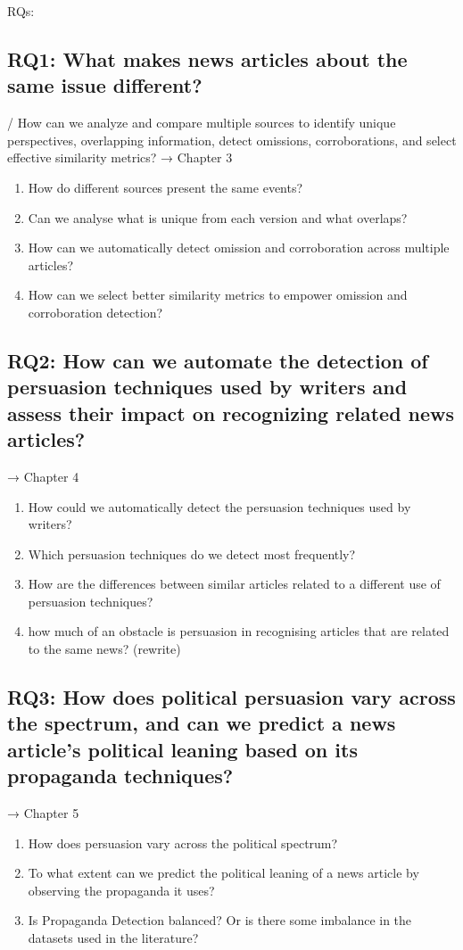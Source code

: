 RQs:

\subsection{RQ1: What makes news articles about the same issue different?}
/ How can we analyze and compare multiple sources to identify unique perspectives, overlapping information, detect omissions, corroborations, and select effective similarity metrics?
→ Chapter 3
\begin{enumerate}[label={\textbf{RQ1.\arabic*:}},leftmargin=2cm]
    \item How do different sources present the same events?
    \item Can we analyse what is unique from each version and what overlaps? 
    \item How can we automatically detect omission and corroboration across multiple articles?
    \item How can we select better similarity metrics to empower omission and corroboration detection?
\end{enumerate}

\subsection{RQ2: How can we automate the detection of persuasion techniques used by writers and assess their impact on recognizing related news articles?}
→ Chapter 4
\begin{enumerate}[label={\textbf{RQ2.\arabic*:}},leftmargin=2cm]
    \item How could we automatically detect the persuasion techniques used by writers?
    \item Which persuasion techniques do we detect most frequently?
    \item How are the differences between similar articles related to a different use of persuasion techniques?
    \item how much of an obstacle is persuasion in recognising articles that are related to the same news? (rewrite)
\end{enumerate}

\subsection{RQ3: How does political persuasion vary across the spectrum, and can we predict a news article's political leaning based on its propaganda techniques?}
→ Chapter 5
\begin{enumerate}[label={\textbf{RQ3.\arabic*:}},leftmargin=2cm]
    \item How does persuasion vary across the political spectrum?
    \item To what extent can we predict the political leaning of a news article by observing the propaganda it uses?
    \item Is Propaganda Detection balanced? Or is there some imbalance in the datasets used in the literature?
\end{enumerate}

